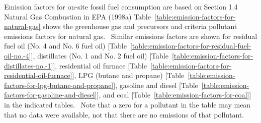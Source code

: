 Emission factors for on-site fossil fuel consumption are based on Section 1.4 Natural Gas Combustion in EPA (1998a) Table~\ref{table:emission-factors-for-natural-gas} shows the greenhouse gas and precursors and criteria pollutant emissions factors for natural gas.~ Similar emissions factors are shown for residual fuel oil (No. 4 and No. 6 fuel oil) {[}Table~\ref{table:emission-factors-for-residual-fuel-oil-no.-4}{]}, distillates (No. 1 and No. 2 fuel oil) {[}Table~\ref{table:emission-factors-for-distillates-no.-1}{]}, residential oil furnace {[}Table~\ref{table:emission-factors-for-residential-oil-furnace}{]}, LPG (butane and propane) {[}Table~\ref{table:emission-factors-for-lpg-butane-and-propane}{]}, gasoline and diesel {[}Table~\ref{table:emission-factors-for-gasoline-and-diesel}{]}, and coal {[}Table~\ref{table:emission-factors-for-coal}{]} in the indicated tables.~ Note that a zero for a pollutant in the table may mean that no data were available, not that there are no emissions of that pollutant.

